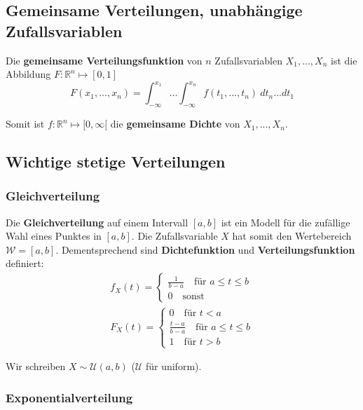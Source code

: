 \documentclass[11pt]{article}
\begin{document}
\subsection{Gemeinsame Verteilungen, unabh{\"a}ngige Zufallsvariablen}

Die \textbf{gemeinsame Verteilungsfunktion} von $n$ Zufallsvariablen $X_1,...,X_n$ ist die Abbildung $F: \mathbb{R}^n \mapsto [0,1]$
\begin{equation*}
	F(x_1,...,x_n) = \int_{-\infty}^{x_1} ... \int_{-\infty}^{x_n} f(t_1,...,t_n)\ dt_n...dt_1
\end{equation*}

Somit ist $f: \mathbb{R}^n \mapsto [0, \infty[$ die \textbf{gemeinsame Dichte} von $X_1,...,X_n$.



\subsection{Wichtige stetige Verteilungen}

\subsubsection{Gleichverteilung}

Die \textbf{Gleichverteilung} auf einem Intervall $[a,b]$ ist ein Modell f{\"u}r die zuf{\"a}llige Wahl eines Punktes in $[a,b]$. Die Zufallsvariable $X$ hat somit den Wertebereich $\mathcal{W} = [a,b]$. Dementsprechend sind \textbf{Dichtefunktion} und \textbf{Verteilungsfunktion} definiert:
\begin{equation*}
\begin{split}
	f_X(t) = \begin{cases}
		\frac{1}{b-a}\quad\text{f{\"u}r }a\leq t \leq b \\
		0\quad\text{sonst }
	\end{cases} \\
	F_X(t) = \begin{cases}
		0\quad\text{f{\"u}r } t < a \\
		\frac{t-a}{b-a}\quad\text{f{\"u}r } a \leq t \leq b \\
		1\quad\text{f{\"u}r } t > b
	\end{cases}
\end{split}
\end{equation*}

Wir schreiben $X \sim \mathcal{U}(a,b)$ ($\mathcal{U}$ f{\"u}r uniform).

\subsubsection{Exponentialverteilung}
\end{document}
